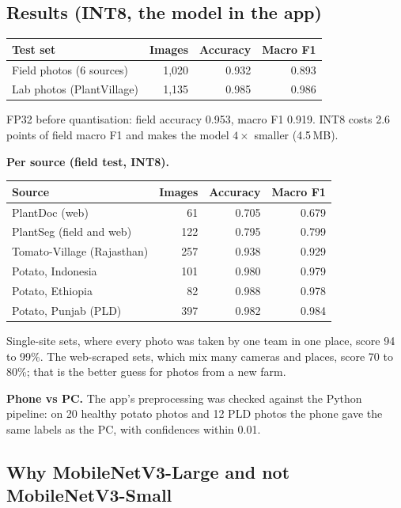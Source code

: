 \documentclass[11pt,a4paper]{article}
\newcommand{\hdr}[1]{\textbf{#1}}
\begin{document}
\subsection{Results (INT8, the model in the app)}

\begin{table}[H]
\centering
\begin{tabular}{@{}lrrr@{}}
\toprule
\hdr{Test set} & \hdr{Images} & \hdr{Accuracy} & \hdr{Macro F1} \\
\midrule
Field photos (6 sources) & 1,020 & 0.932 & 0.893 \\
Lab photos (PlantVillage) & 1,135 & 0.985 & 0.986 \\
\bottomrule
\end{tabular}
\end{table}

FP32 before quantisation: field accuracy 0.953, macro F1 0.919. INT8 costs 2.6
points of field macro F1 and makes the model $4\times$ smaller (4.5\,MB).

\textbf{Per source (field test, INT8).}

\begin{table}[H]
\centering
\begin{tabular}{@{}lrrr@{}}
\toprule
\hdr{Source} & \hdr{Images} & \hdr{Accuracy} & \hdr{Macro F1} \\
\midrule
PlantDoc (web) & 61 & 0.705 & 0.679 \\
PlantSeg (field and web) & 122 & 0.795 & 0.799 \\
Tomato-Village (Rajasthan) & 257 & 0.938 & 0.929 \\
Potato, Indonesia & 101 & 0.980 & 0.979 \\
Potato, Ethiopia & 82 & 0.988 & 0.978 \\
Potato, Punjab (PLD) & 397 & 0.982 & 0.984 \\
\bottomrule
\end{tabular}
\end{table}

Single-site sets, where every photo was taken by one team in one place, score 94
to 99\%. The web-scraped sets, which mix many cameras and places, score 70 to
80\%; that is the better guess for photos from a new farm.

\textbf{Phone vs PC.} The app's preprocessing was checked against the Python
pipeline: on 20 healthy potato photos and 12 PLD photos the phone gave the same
labels as the PC, with confidences within 0.01.

\subsection{Why MobileNetV3-Large and not MobileNetV3-Small}
\end{document}
